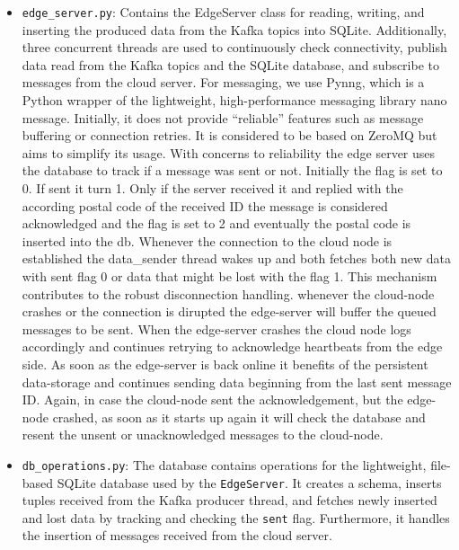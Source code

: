 \documentclass[a4paper]{article}
\begin{document}
\begin{itemize}
    \item \texttt{edge\_server.py}: Contains the EdgeServer class for reading,
        writing, and inserting the produced data from the Kafka topics into
        SQLite. Additionally, three concurrent threads are used to continuously
        check connectivity, publish data read from the Kafka topics and the
        SQLite database, and subscribe to messages from the cloud server. For
        messaging, we use Pynng, which is a Python wrapper of the lightweight,
        high-performance messaging library nano message. Initially, it does not provide
        \enquote{reliable} features such as message buffering or connection
        retries. It is considered to be based on ZeroMQ but aims to simplify its
        usage. With concerns to reliability the edge server uses the database to
        track if a message was sent or not. Initially the flag is set to 0. If sent it turn 1.
        Only if the server received it and replied with the according postal code of the received ID
        the message is considered acknowledged and the flag is set to 2 and eventually the postal code
        is inserted into the db. Whenever the connection to the cloud node is established the data_sender
        thread wakes up and both fetches both new data with sent flag 0 or data that might be lost with the
        flag 1. This mechanism contributes to the robust disconnection handling. whenever the cloud-node 
        crashes or the connection is dirupted the edge-server will buffer the queued messages to be sent.
        When the edge-server crashes the cloud node logs accordingly and continues retrying to acknowledge 
        heartbeats from the edge side. As soon as the edge-server is back online it benefits of the persistent
        data-storage and continues sending data beginning from the last sent message ID. Again, in case the 
        cloud-node sent the acknowledgement, but the edge-node crashed, as soon as it starts up again it will 
        check the database and resent the unsent or unacknowledged messages to the cloud-node.

    \item \texttt{db\_operations.py}: The database contains operations for the
        lightweight, file-based SQLite database used by the \texttt{EdgeServer}.
        It creates a schema, inserts tuples received from the Kafka producer
        thread, and fetches newly inserted and lost data by tracking and
        checking the \texttt{sent} flag. Furthermore, it handles the insertion
        of messages received from the cloud server.


\end{itemize}
\end{document}
